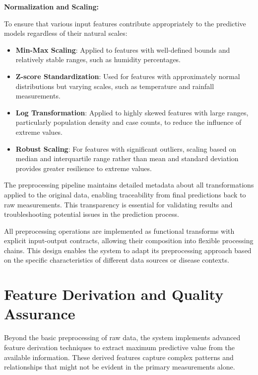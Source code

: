 \documentclass[12pt,a4paper]{report}
\begin{document}
\textbf{Normalization and Scaling:}

To ensure that various input features contribute appropriately to the predictive models regardless of their natural scales:

\begin{itemize}
    \item \textbf{Min-Max Scaling}: Applied to features with well-defined bounds and relatively stable ranges, such as humidity percentages.
    
    \item \textbf{Z-score Standardization}: Used for features with approximately normal distributions but varying scales, such as temperature and rainfall measurements.
    
    \item \textbf{Log Transformation}: Applied to highly skewed features with large ranges, particularly population density and case counts, to reduce the influence of extreme values.
    
    \item \textbf{Robust Scaling}: For features with significant outliers, scaling based on median and interquartile range rather than mean and standard deviation provides greater resilience to extreme values.
\end{itemize}

The preprocessing pipeline maintains detailed metadata about all transformations applied to the original data, enabling traceability from final predictions back to raw measurements. This transparency is essential for validating results and troubleshooting potential issues in the prediction process.

All preprocessing operations are implemented as functional transforms with explicit input-output contracts, allowing their composition into flexible processing chains. This design enables the system to adapt its preprocessing approach based on the specific characteristics of different data sources or disease contexts.

\section{Feature Derivation and Quality Assurance}
Beyond the basic preprocessing of raw data, the system implements advanced feature derivation techniques to extract maximum predictive value from the available information. These derived features capture complex patterns and relationships that might not be evident in the primary measurements alone.
\end{document}
